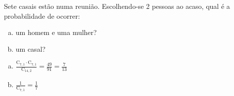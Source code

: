 \begin{ex}
 Sete casais estão numa reunião. Escolhendo-se 2 pessoas ao acaso, qual é a probabilidade de ocorrer:
    \begin{enumerate}[(a)]
    \item um homem e uma mulher?
    \item um casal?
    \end{enumerate}
      \begin{sol}
       \phantom{A}
        \begin{enumerate} [(a)]
            \item $\frac{\mathrm{C}_{7,1}\cdot\mathrm{C}_{7,1}}{\mathrm{C}_{{14},2}}=\frac{49}{91}=\frac{7}{13}$
            \item $\frac{1}{\mathrm{C}_{7,1}}=\frac{1}{7}$
        \end{enumerate}
      \end{sol}
\end{ex}